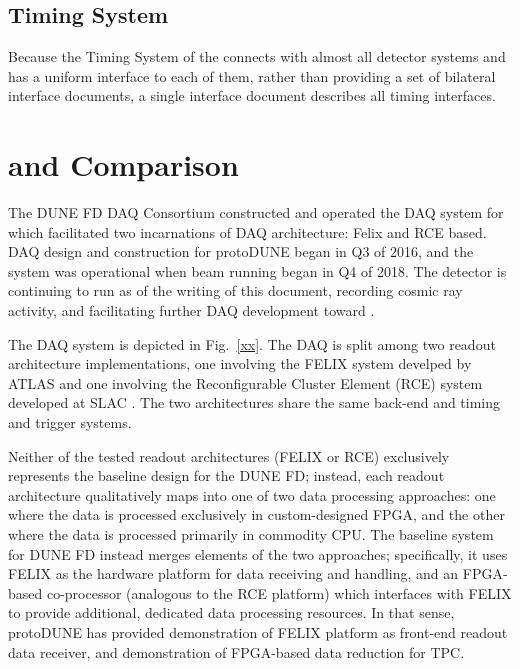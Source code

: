 \subsection{Timing System}
Because the Timing System of the   connects with
almost all detector systems and has a uniform interface to each of
them, rather than providing a set of 
bilateral interface documents, a single interface document
 describes all timing interfaces. 

\section{ and  Comparison}
\label{sec:fd-daq:protodune}

The DUNE FD DAQ Consortium constructed and operated the DAQ system for
 which facilitated two incarnations of DAQ
architecture: Felix and RCE based. DAQ design and construction for
protoDUNE began in Q3 of 2016, and the system was operational when
 beam running began in Q4 of 2018. The detector is
continuing to run as of the writing of this document, recording cosmic
ray activity, and facilitating further DAQ development toward
.

The  DAQ system is depicted in
Fig.~\ref{xx}. The DAQ is split among two readout architecture
implementations, one involving the FELIX system develped by ATLAS \cite{xx} and one
involving the Reconfigurable Cluster Element (RCE) system developed at
SLAC \cite{xx}. The two architectures share the same back-end and
timing and trigger systems. 

Neither of the tested readout architectures (FELIX or RCE) exclusively represents the
baseline design for the DUNE FD; instead, each readout architecture
qualitatively maps into one of
two data processing approaches: one where the data is processed
exclusively in
custom-designed FPGA, and the other where the data is processed primarily in commodity
CPU. The baseline system for DUNE FD  instead
merges elements of the two approaches; specifically, it uses FELIX as
the hardware platform for data receiving and handling, and an
FPGA-based co-processor (analogous to the RCE platform) which
interfaces with FELIX to provide additional, dedicated data processing
resources. In that sense, protoDUNE has provided demonstration of
FELIX platform as front-end readout data receiver, and
demonstration of FPGA-based data reduction for TPC.

